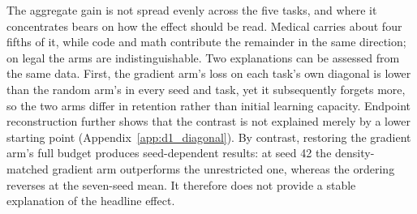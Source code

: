 The aggregate gain is not spread evenly across the five tasks, and where it concentrates bears on how the effect should be read. Medical carries about four fifths of it, while code and math contribute the remainder in the same direction; on legal the arms are indistinguishable. 
Two explanations can be assessed from the same data. First, the gradient arm's loss on each task's own diagonal is lower than the random arm's in every seed and task, yet it subsequently forgets more, so the two arms differ in retention rather than initial learning capacity. Endpoint reconstruction further shows that the contrast is not explained merely by a lower starting point (Appendix~\ref{app:d1_diagonal}). By contrast, restoring the gradient arm's full budget produces seed-dependent results: at seed 42 the density-matched gradient arm outperforms the unrestricted one, whereas the ordering reverses at the seven-seed mean. It therefore does not provide a stable explanation of the headline effect.


